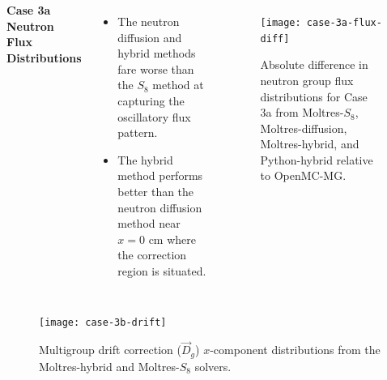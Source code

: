 \begin{frame}[noframenumbering]
  \begin{columns}
    \column{5.5cm}
    \textbf{Case 3a Neutron Flux Distributions}
    \begin{itemize}
      \item The neutron diffusion and hybrid methods fare worse than the $S_8$ method at capturing
        the oscillatory flux pattern.
      \item The hybrid method performs better than the neutron diffusion method near $x=0$ cm where
        the correction region is situated.
    \end{itemize}
    \column{5.5cm}
    \begin{figure}[htb!]
      \centering
      \texttt{[image: case-3a-flux-diff]}
      \caption{Absolute difference in neutron group flux distributions for Case 3a from Moltres-$S_8$,
      Moltres-diffusion, Moltres-hybrid, and Python-hybrid relative to OpenMC-MG.}
      \label{fig:3a-flux-diff}
    \end{figure}
  \end{columns}
\end{frame}

\begin{frame}[noframenumbering]
  \begin{figure}[t]
    \centering
    \texttt{[image: case-3b-drift]}
    \caption{Multigroup drift correction ($\vec{D}_g$) $x$-component distributions from the
    Moltres-hybrid and Moltres-$S_8$ solvers.}
    \label{fig:3b-drift}
  \end{figure}
\end{frame}

